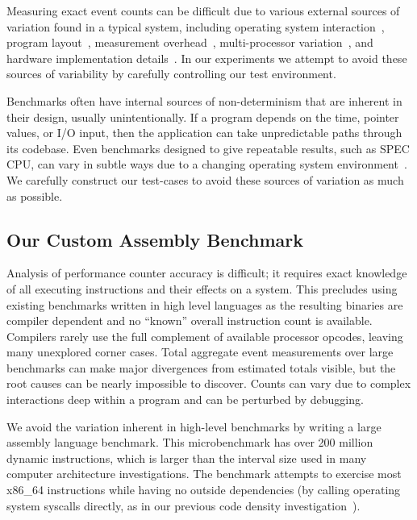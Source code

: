 Measuring exact event counts can be difficult due to various 
external sources of variation found in a typical system, including
operating system interaction~\cite{mcguire+:rtlw09},
program layout~\cite{weaver+:iiswc08,mytkowicz+:asplos09},
measurement overhead~\cite{zaparanuks+:ispass09},
multi-processor variation~\cite{alameldeen+:hpca03}, and
hardware implementation details~\cite{weaver+:iiswc08,weaver:thesis10}.
In our experiments we attempt to avoid these sources of variability by
carefully controlling our test environment.

Benchmarks often have internal sources of non-determinism
that are inherent in their design, usually unintentionally.
If a program depends on the time, pointer values, or I/O input,
then the application can take unpredictable paths through its
codebase.
Even benchmarks designed to give repeatable results,
such as SPEC CPU, can vary in subtle ways due to a changing
operating system environment~\cite{weaver+:iiswc08}.
We carefully construct our test-cases to avoid 
these sources of variation as much as possible.

\subsection{Our Custom Assembly Benchmark}

Analysis of performance counter accuracy is difficult;
it requires exact knowledge of all executing instructions
and their effects on a system.
This precludes using existing benchmarks written in high level languages 
as the resulting binaries are compiler dependent and no
``known'' overall instruction count is available.
Compilers rarely use the full complement of available 
processor opcodes, leaving many unexplored corner cases.
Total aggregate event measurements over large benchmarks can
make major divergences from estimated totals visible, 
but the root causes can be nearly impossible 
to discover.  
Counts can vary due to complex interactions
deep within a program and can be perturbed by debugging.

We avoid the variation inherent in high-level benchmarks
by writing a large assembly language benchmark. 
This microbenchmark has over 200 million dynamic instructions,
which is larger than the interval size used in many computer 
architecture investigations.
The benchmark attempts to exercise most x86\_64 instructions
while having no outside dependencies (by calling 
operating system syscalls directly, as in 
our previous code density investigation~\cite{weaver+:iccd09}).

